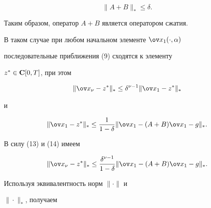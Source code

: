 $$


\|A+B\|_*\le {\delta}.


$$


Таким образом, оператор $A+B$ является оператором сжатия.


В таком случае при любом начальном элементе ${\ov x_1}(\cdot,{\alpha})$


последовательные приближения (9) сходятся к элементу


$z^*\in {\bold C}[0,T]$, при этом


\begin{equation}


\|{\ov x_{\nu}}-z^*\|_*\le 


{\delta}^{{\nu}-1}


\|{\ov x_1}-z^*\|_*


\end{equation}


и


\begin{equation}


\|{\ov x_1}-z^*\|_*\le \frac{1}{1-{\delta}}


\|{\ov x_1}-(A+B){\ov x_1}-g\|_*.


\end{equation}


В силу (13) и (14) имеем


$$


\|{\ov x_{\nu}}-z^*\|_*\le 


\frac{{\delta}^{{\nu}-1}}{1-{\delta}}\|{\ov x_1}-(A+B){\ov x_1}-g


\|_*.


$$


Используя эквивалентность норм $\|\cdot\|$ и


$\|\cdot\|_*$, получаем


